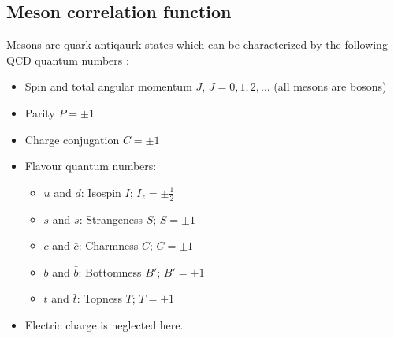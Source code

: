 \subsection{Meson correlation function}
    Mesons are quark-antiqaurk states which can be characterized by the following QCD quantum numbers \cite{introduction_to_lattice_hadron_spectroscopy}:
    \begin{itemize}
        \item Spin and total angular momentum $J$, $J = 0, 1, 2,...$ (all mesons are bosons)
        \item Parity $P = \pm1$
        \item Charge conjugation $C = \pm1$
        \item Flavour quantum numbers:
            \begin{itemize}
                \item $u$ and $d$: Isospin $I$; $I_z = \pm\frac{1}{2}$
                \item $s$ and $\bar{s}$: Strangeness $S$; $S = \pm 1$
                \item $c$ and $\bar{c}$: Charmness $C$; $C = \pm 1$
                \item $b$ and $\bar{b}$: Bottomness $B'$; $B' = \pm 1$
                \item $t$ and $\bar{t}$: Topness $T$; $T = \pm 1$
            \end{itemize}
        \item Electric charge is neglected here.
    \end{itemize}
    
